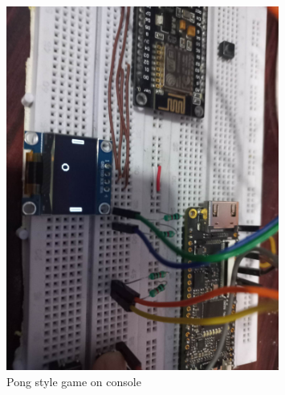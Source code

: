 \documentclass[a4paper,12pt]{article}
\begin{document}
    \begin{figure}[H]
    \centering
    \includegraphics[width=0.8\textwidth]{images/fpga_pong.jpg} 
    \caption{Pong style game on console}
    \end{figure}
\end{document}

